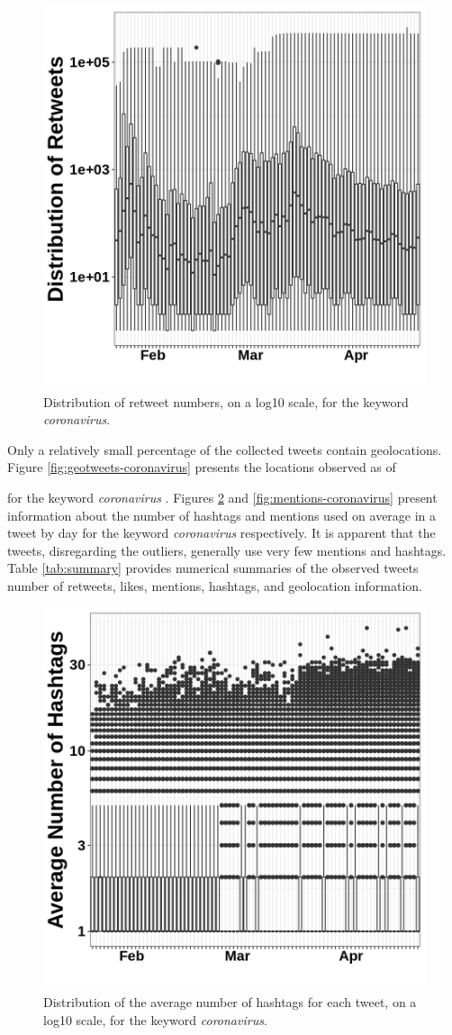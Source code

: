 \documentclass{article}
\begin{document}
\begin{figure}[!h]
    \centering
    \includegraphics[width=0.33 \textwidth]{images/retweets_coronavirus.png}
    \caption{Distribution of retweet numbers, on a log10 scale, for the keyword \textit{coronavirus}.}
    \label{fig:retweets-coronavirus}
\end{figure}

Only a relatively small percentage of the collected tweets contain geolocations. Figure \ref{fig:geotweets-coronavirus}  presents the locations observed as of \date\ for the keyword \textit{coronavirus} . Figures \ref{fig:hashtags-coronavirus} and \ref{fig:mentions-coronavirus} present information about the number of hashtags and mentions used on average in a tweet by day for the keyword \textit{coronavirus} respectively. It is apparent that the tweets, disregarding the outliers, generally use very few mentions and hashtags. Table \ref{tab:summary} provides numerical summaries of
the observed tweets number of retweets, likes, mentions, hashtags, and geolocation information.


\begin{figure}[t]
    \centering
    \includegraphics[width=0.35 \textwidth]{images/hashtags_coronavirus.png}
    \caption{Distribution of the average number of hashtags for each tweet, on a log10 scale, for the keyword \textit{coronavirus}.}
    \label{fig:hashtags-coronavirus}
\end{figure}
\end{document}
